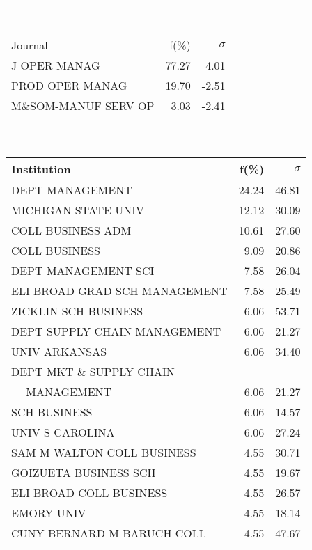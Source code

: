 \documentclass[a4paper,11pt]{report}
\begin{document}
\begin{landscape}
\begin{table}[!ht]
{\begin{tabular}{|l r r|}
 &  & \\
 &  & \\
 &  & \\
 &  & \\
 &  & \\
 &  & \\
 &  & \\
\hline
\hline
Journal & f(\%) & $\sigma$\\
\hline
J OPER MANAG & 77.27 & 4.01\\
PROD OPER MANAG & 19.70 & -2.51\\
M\&SOM-MANUF SERV OP & 3.03 & -2.41\\
 &  & \\
 &  & \\
 &  & \\
 &  & \\
 &  & \\
 &  & \\
 &  & \\
\hline
\end{tabular}
}
{\scriptsize\begin{tabular}{|l r r|}
\hline
Institution & f(\%) & $\sigma$\\
\hline
DEPT MANAGEMENT & 24.24 & 46.81\\
MICHIGAN STATE UNIV & 12.12 & 30.09\\
COLL BUSINESS ADM & 10.61 & 27.60\\
COLL BUSINESS & 9.09 & 20.86\\
DEPT MANAGEMENT SCI & 7.58 & 26.04\\
ELI BROAD GRAD SCH MANAGEMENT & 7.58 & 25.49\\
ZICKLIN SCH BUSINESS & 6.06 & 53.71\\
DEPT SUPPLY CHAIN MANAGEMENT & 6.06 & 21.27\\
UNIV ARKANSAS & 6.06 & 34.40\\
DEPT MKT \& SUPPLY CHAIN &  & \\
$\quad$ MANAGEMENT & 6.06 & 21.27\\
SCH BUSINESS & 6.06 & 14.57\\
UNIV S CAROLINA & 6.06 & 27.24\\
SAM M WALTON COLL BUSINESS & 4.55 & 30.71\\
GOIZUETA BUSINESS SCH & 4.55 & 19.67\\
ELI BROAD COLL BUSINESS & 4.55 & 26.57\\
EMORY UNIV & 4.55 & 18.14\\
CUNY BERNARD M BARUCH COLL & 4.55 & 47.67\\

\end{tabular}}
\end{table}
\end{landscape}
\end{document}

